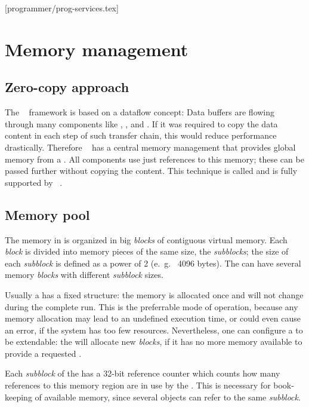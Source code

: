 [programmer/prog-services.tex]

\section{Memory management}
\label{prog_services_memory}
\subsection{Zero-copy approach}
The \dabc~ framework is based on a dataflow concept: Data buffers are 
flowing through many components like , , 
and . 
If it was required to copy the data content
in each step of such transfer chain,
this would reduce performance drastically. 
Therefore \dabc~ has a central memory management that provides
global memory  from a .
All components use just references to this memory;
these can be passed further without copying the content. 
This technique is called  and is fully supported by \dabc~.


\subsection{Memory pool}
\label{prog_services_memory_pool}
The memory in  is organized in big {\em blocks} of 
contiguous virtual memory.
Each {\em block} is divided into memory pieces of the same size, 
the {\em subblocks}; the size of each {\em subblock} is defined as 
a power of 2 (e.~g.~ 4096 bytes). The  can have 
several memory {\em blocks} with different {\em subblock} sizes.

Usually a  has a fixed structure: the memory is allocated once 
and will not change during the complete run. 
This is the preferrable mode of operation, because any 
memory allocation may lead to an undefined execution time,
or could even cause an error, if the system has too few resources. 
Nevertheless, one can configure a  to be extendable:
the  will allocate new {\em blocks}, 
if it has no more memory available to provide a requested .   

Each {\em subblock} of the    has a 32-bit reference counter 
which counts how many references to this memory region are in use
by the . This is necessary for book-keeping of available
memory, since several  objects 
can refer to the same {\em subblock}.   

